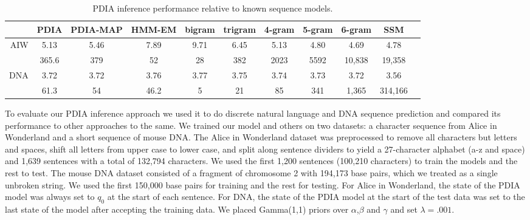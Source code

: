 \begin{table}[t]
    \begin{center}
    \setlength{\tabcolsep}{1.3mm}
\begin{tabular}{r|cccccccccc}
\hline
& PDIA  & PDIA-MAP &  HMM-EM & bigram& trigram & 4-gram & 5-gram & 6-gram & SSM \\
\hline
AIW & 5.13 & 5.46 &  7.89 & 9.71 & 6.45 & 5.13 & 4.80 & 4.69 & 4.78 \\
  & 365.6 & 379 & 52 & 28 & 382 & 2023 & 5592 & 10,838 & 19,358 \\
\hline
\hline
DNA & 3.72 & 3.72 &  3.76 & 3.77 & 3.75 & 3.74 & 3.73 & 3.72 & 3.56 \\
 & 61.3 & 54 & 46.2 &  5 & 21 & 85 & 341 & 1,365 & 314,166 \\
\hline
\end{tabular}
\end{center}
\caption[Short]{PDIA inference performance relative to known sequence models.}
\label{table:results}
\end{table}

To evaluate our PDIA inference approach we used it to do discrete natural language and DNA sequence prediction and compared its performance to other approaches to the same.  We trained our model and others on two datasets: a character sequence from Alice in Wonderland and a short sequence of mouse DNA.  The Alice in Wonderland dataset was preprocessed to remove all characters but letters and spaces, shift all letters from upper case to lower case, and split along sentence dividers to yield a 27-character alphabet (a-z and space) and 1,639 sentences with a total of 132,794 characters.  We used the first 1,200 sentences (100,210 characters) to train the models and the rest to test.    The mouse DNA dataset consisted of a fragment of chromosome 2 with 194,173 base pairs, which we treated as a single unbroken string.  We used the first 150,000 base pairs for training and the rest for testing.  For Alice in Wonderland, the state of the PDIA model was always set to $q_0$ at the start of each sentence.  For DNA, the state of the PDIA model at the start of the test data was set to the last state of the model after accepting the training data.  We placed Gamma(1,1) priors over $\alpha$,$\beta$ and $\gamma$ and set $\lambda=.001.$

